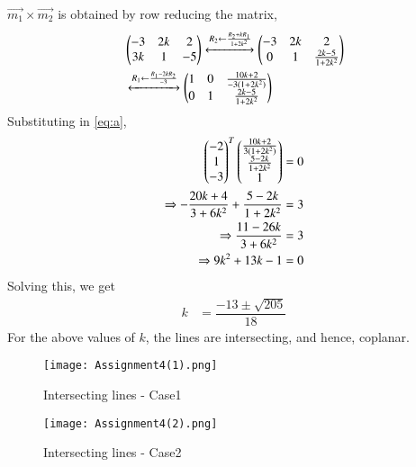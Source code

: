 \documentclass[journal,12pt,twocolumn]{IEEEtran}
\begin{document}
$\vec{m_{1}}\times\vec{m_{2}}$ is obtained by row reducing the matrix,
\begin{align}
    &\begin{pmatrix}-3 & 2k & 2 \\
    3k & 1 & -5\end{pmatrix}\xleftrightarrow {R_2\leftarrow\frac{R_2+kR_1}{1+2k^2}}\begin{pmatrix}-3 & 2k & 2 \\
    0 & 1 & \frac{2k-5}{1+2k^{2}}\end{pmatrix}\\
    &\xleftrightarrow {R_1\leftarrow \frac{R_1-2kR_2}{-3}}\begin{pmatrix}1 & 0 & \frac{10k+2}{-3(1+2k^{2})} \\
    0 & 1 & \frac{2k-5}{1+2k^{2}}\end{pmatrix}
\end{align}
Substituting in \eqref{eq:a},
\begin{align}
    \begin{pmatrix}-2\\1\\-3\end{pmatrix}^{T}\begin{pmatrix}\frac{10k+2}{3(1+2k^{2})}\\\frac{5-2k}{1+2k^{2}}\\1\end{pmatrix}&=0\\
    \Rightarrow -\frac{20k+4}{3+6k^{2}}+\frac{5-2k}{1+2k^{2}}&=3\\
    \Rightarrow \frac{11-26k}{3+6k^{2}}&=3\\
    \Rightarrow 9k^2+13k-1&=0
\end{align}
Solving this, we get
\begin{align}
    k&=\dfrac{-13\pm \sqrt{205}}{18}
\end{align}
For the above values of $k$, the lines are intersecting, and hence, coplanar.
\begin{figure}[!h]
 \centering
 \texttt{[image: Assignment4(1).png]}
 \caption{Intersecting lines - Case1}
 \label{plot}
\end{figure}
\begin{figure}[!h]
 \centering
 \texttt{[image: Assignment4(2).png]}
 \caption{Intersecting lines - Case2}
 \label{plot}
\end{figure}
\end{document}
